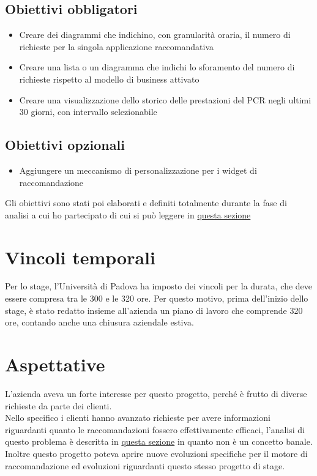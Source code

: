 \documentclass[a4paper, 12pt, twoside, openright]{book}
\begin{document}
\subsection{Obiettivi obbligatori}
\begin{itemize}
\item Creare dei diagrammi che indichino, con granularità oraria, il numero di richieste per la singola applicazione raccomandativa
\item Creare una lista o un diagramma che indichi lo sforamento del numero di richieste rispetto al modello di business attivato
\item Creare una visualizzazione dello storico delle prestazioni del PCR negli ultimi 30 giorni, con intervallo selezionabile
\end{itemize}

\subsection{Obiettivi opzionali}
\begin{itemize}
\item Aggiungere un meccanismo di personalizzazione per i widget di raccomandazione
\end{itemize}

Gli obiettivi sono stati poi elaborati e definiti totalmente durante la fase di analisi a cui ho partecipato di cui si può leggere in \hyperref[analisi]{questa sezione}

\section{Vincoli temporali}
Per lo stage, l'Università di Padova ha imposto dei vincoli per la durata, che deve essere compresa tra le 300 e le 320 ore. Per questo motivo, prima dell'inizio dello stage, è stato redatto insieme all'azienda un piano di lavoro che comprende 320 ore, contando anche una chiusura aziendale estiva.

\section{Aspettative}
L'azienda aveva un forte interesse per questo progetto, perché è frutto di diverse richieste da parte dei clienti.\\
Nello specifico i clienti hanno avanzato richieste per avere informazioni riguardanti quanto le raccomandazioni fossero effettivamente efficaci, l'analisi di questo problema è descritta in \hyperref[analisi-pcr]{questa sezione} in quanto non è un concetto banale.\\
Inoltre questo progetto poteva aprire nuove evoluzioni specifiche per il motore di raccomandazione ed evoluzioni riguardanti questo stesso progetto di stage.
\end{document}

